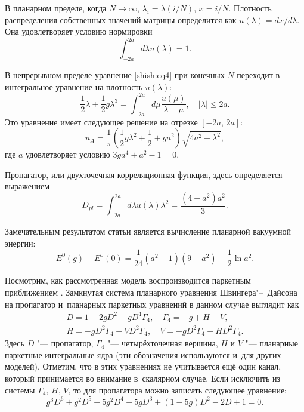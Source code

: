 В планарном пределе, когда $N \to \infty$, $ \lambda_i=\lambda(i/N)$, $ x=i/N$. 
Плотность распределения собственных значений матрицы определится как $u(\lambda)=dx/d\lambda.$ 
Она удовлетворяет условию нормировки
\begin{equation*}
\int^{2a}_{-2a}d\lambda u(\lambda)=1.
\end{equation*}

В непрерывном пределе уравнение \eqref{shish:eq4} при конечных $N$ переходит в интегральное уравнение на  плотность $u(\lambda)$:
\begin{equation*}
\frac{1}{2}\lambda + \frac{1}{2}g\lambda^3=\int ^{2a}_{-2a} d\mu \frac{u(\mu)}{\lambda- \mu},\quad |\lambda| \le 2a.
\end{equation*}
Это уравнение  имеет следующее решение \cite{shish:bipz} на отрезке $[-2a,\, 2a]$:
\begin{equation*}
u_A=\frac{1}{\pi}\left(\frac{1}{2}g{\lambda}^2+\frac{1}{2}+ga^2 \right)\sqrt{4a^2-{\lambda}^2},
\end{equation*}
где $a$ удовлетворяет условию $3 ga^4 + a^2-1=0$.

Пропагатор, или двухточечная корреляционная функция, здесь определяется выражением
\begin{equation*}
D_{pl}=\int_{-2a}^{2a} d \lambda u(\lambda)\lambda^2=\frac{(4+a^2)a^2}{3}.
\end{equation*}

Замечательным результатом статьи \cite{shish:bipz} является вычисление планарной вакуумной энергии:
\begin{equation*}
E^0(g)-E^0(0)=\frac{1}{24}(a^2-1)(9-a^2)-\frac{1}{2}\ln a^2.
\end{equation*}

Посмотрим, как рассмотренная модель воспроизводится паркетным приближением \cite{shish:az}. 
Замкнутая система планарного уравнения Швингера"--~Дайсона на пропагатор и~планарных паркетных уравнений в данном случае выглядит как
\begin{gather*}
D=1-2gD^2-gD^4\Gamma_4,\quad 
\Gamma_4=-g+H+V,\\
H=-gD^2\Gamma_4+VD^2\Gamma_4,\quad 
V=-gD^2\Gamma_4+HD^2\Gamma_4.
\end{gather*}
Здесь $D$ "--- пропагатор, $ \Gamma_4$ "--- четырёхточечная вершина, $H$ и $V$ "--- планарные паркетные интегральные ядра (эти обозначения используются и~для других моделей). 
Отметим, что в этих уравнениях не учитывается ещё один канал, который принимается во внимание в~скалярном случае. 
Если исключить из системы $\Gamma_4$, $H$, $V$, то для пропагатора можно записать следующее уравнение:
\begin{equation*}
g^3 D^6 + g^2D^5 + 5g^2D^4 + 5gD^3 + (1-5g)D^2 - 2D + 1=0.
\end{equation*}

